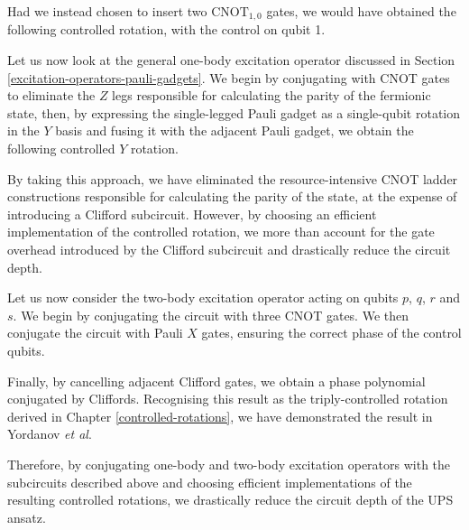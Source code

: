 
Had we instead chosen to insert two $\text{CNOT}_{1, 0}$ gates, we would have obtained the following controlled rotation, with the control on qubit 1.


Let us now look at the general one-body excitation operator discussed in Section \ref{excitation-operators-pauli-gadgets}. We begin by conjugating with CNOT gates to eliminate the $Z$ legs responsible for calculating the parity of the fermionic state, then, by expressing the single-legged Pauli gadget as a single-qubit rotation in the $Y$ basis and fusing it with the adjacent Pauli gadget, we obtain the following controlled $Y$ rotation.


By taking this approach, we have eliminated the resource-intensive CNOT ladder constructions responsible for calculating the parity of the state, at the expense of introducing a Clifford subcircuit. However, by choosing an efficient implementation of the controlled rotation, we more than account for the gate overhead introduced by the Clifford subcircuit and drastically reduce the circuit depth.

Let us now consider the two-body excitation operator acting on qubits $p$, $q$, $r$ and $s$. We begin by conjugating the circuit with three CNOT gates. We then conjugate the circuit with Pauli $X$ gates, ensuring the correct phase of the control qubits.


Finally, by cancelling adjacent Clifford gates, we obtain a phase polynomial conjugated by Cliffords. Recognising this result as the triply-controlled rotation derived in Chapter \ref{controlled-rotations}, we have demonstrated the result in Yordanov \textit{et al}.


Therefore, by conjugating one-body and two-body excitation operators with the subcircuits described above and choosing efficient implementations of the resulting controlled rotations, we drastically reduce the circuit depth of the UPS ansatz.

